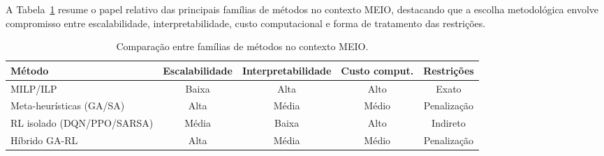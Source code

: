 A Tabela~\ref{tab:met_comp_proposta} resume o papel relativo das principais famílias de métodos no contexto MEIO, destacando que a escolha metodológica envolve compromisso entre escalabilidade, interpretabilidade, custo computacional e forma de tratamento das restrições.

\begin{table}[htbp]
\centering
\small
\caption{Comparação entre famílias de métodos no contexto MEIO.}
\label{tab:met_comp_proposta}
\begin{tabular}{lcccc}
\toprule
Método & Escalabilidade & Interpretabilidade & Custo comput. & Restrições \\
\midrule
MILP/ILP & Baixa & Alta & Alto & Exato \\
Meta-heurísticas (GA/SA) & Alta & Média & Médio & Penalização \\
RL isolado (DQN/PPO/SARSA) & Média & Baixa & Alto & Indireto \\
Híbrido GA-RL & Alta & Média & Médio & Penalização \\
\bottomrule
\end{tabular}
\end{table}
